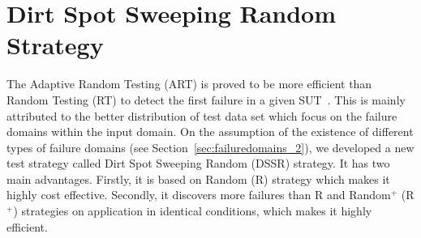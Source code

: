 
\chapter{Dirt Spot Sweeping Random Strategy}
\label{chap:DSSR}








The Adaptive Random Testing (ART) is proved to be more efficient than Random Testing (RT) to detect the first failure in a given SUT~\cite{chen2005adaptive}. This is mainly attributed to the better distribution of test data set which focus on the failure domains within the input domain. On the assumption of the existence of different types of failure domains (see Section~\ref{sec:failuredomains_2}), we developed a new test strategy called Dirt Spot Sweeping Random (DSSR) strategy. It has two main advantages. Firstly, it is based on Random (R) strategy which makes it highly cost effective. Secondly, it discovers more failures than R and Random$^+$ (R$^+$) strategies on application in identical conditions, which makes it highly efficient.  

